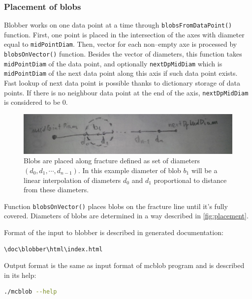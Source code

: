 \subsubsection{Placement of blobs}

Blobber works on one data point at a time through \texttt{blobs\-From\-Data\-Point()}
function. First, one point is placed in the intersection of the axes with
diameter equal to \texttt{mid\-Point\-Diam}. Then, vector for each non--empty
axe is processed by \texttt{blobsOnVector()} function. Besides the vector of
diameters, this function takes \texttt{midPointDiam} of the data point, and optionally
\texttt{nextDpMidDiam} which is \texttt{midPointDiam} of the next data point
along this axis if such data point exists. Fast lookup of next data point
is possible thanks to dictionary storage of data points. If there is no neighbour data
point at the end of the axis, \texttt{nextDpMidDiam} is considered to be 0.

\begin{figure}[htb]
  \begin{center}
    \includegraphics[width=\textwidth]{chapters/project/placement.jpg}
  \end{center}
  \caption{Blobs are placed along fracture defined as set of diameters
    $(d_0,d_1,\cdots,d_{n-1})$. In this example diameter of blob $b_1$ will be a
    linear interpolation of diameters $d_0$ and $d_1$ proportional to distance
    from these diameters.}
  \label{fig:placement}
\end{figure}

Function \texttt{blobsOnVector()} places blobs on the fracture line until
it's fully covered. Diameters of blobs are determined in a way described
in \autoref{fig:placement}.

Format of the input to blobber is described in generated documentation:
\begin{lstlisting}[language=bash,numbers=none]
\doc\blobber\html\index.html
\end{lstlisting}

Output format is the same as input format of mcblob program and is described in
its help:
\begin{lstlisting}[language=bash,numbers=none]
./mcblob --help
\end{lstlisting}

